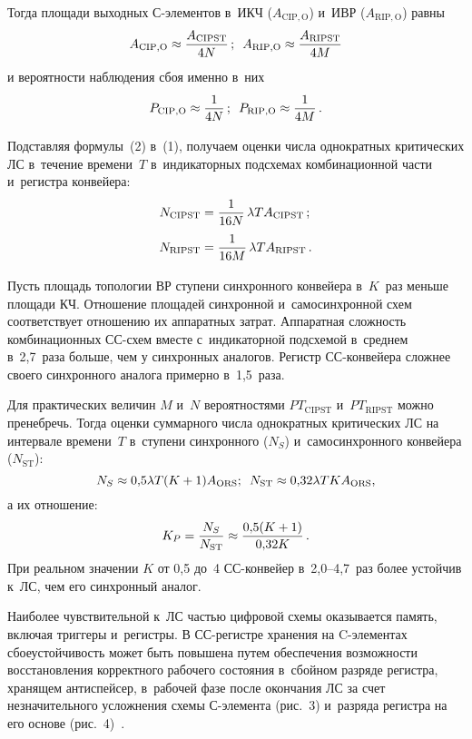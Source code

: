 \begin{multicols}{2}
  Тогда площади выходных С-эле\-мен\-тов в~ИКЧ ($A_{\mathrm{CIP,O}}$) и~ИВР 
($A_{\mathrm{RIP,O}}$) равны 
  $$
  A_{\mathrm{CIP,O}}\approx \displaystyle\frac{\displaystyle A_{\mathrm{CIPST}}\mathstrut}{\displaystyle 4N\mathstrut}\,;\enskip
  A_{\mathrm{RIP,O}}\approx \displaystyle\frac{\displaystyle A_{\mathrm{RIPST}}\mathstrut}{\displaystyle 4M\mathstrut}
  $$
и вероятности наблюдения сбоя именно в~них
\begin{equation}
P_{\mathrm{CIP,O}}\approx\displaystyle\frac{\displaystyle 1\mathstrut}{\displaystyle 4N\mathstrut}\,;\enskip P_{\mathrm{RIP,O}}\approx \displaystyle\frac{\displaystyle 1\mathstrut}{\displaystyle 4M\mathstrut}\,.
\label{e2-sok}
\end{equation}
  
  Подставляя формулы~(2) в~(1), получаем оценки  числа однократных 
критических ЛС в~течение времени~$T$ в~индикаторных подсхемах 
комбинационной части и~регистра конвейера:
  \begin{align*}
  N_{\mathrm{CIPST}} &=\displaystyle\frac{\displaystyle 1\mathstrut}{\displaystyle 16N\mathstrut}\,\lambda TA_{\mathrm{CIPST}}\,;\\
  N_{\mathrm{RIPST}}&= \displaystyle\frac{\displaystyle 1\mathstrut}{\displaystyle 16M\mathstrut}\,\lambda T A_{\mathrm{RIPST}}\,.
  \end{align*}
  
  Пусть площадь топологии ВР ступени синхронного конвейера в~$K$~раз 
меньше площади КЧ. Отношение площадей синхронной и~самосинхронной схем 
соответствует отношению их аппаратных затрат. Аппаратная сложность 
комбинационных СС-схем вместе с~индикаторной подсхемой в~среднем 
в~2,7~раза больше, чем у синхронных аналогов. Регистр СС-кон\-вей\-ера 
сложнее своего синхронного аналога примерно в~1,5~раза.
  
  Для практических величин $M$ и~$N$ вероятностями $PT_{\mathrm{CIPST}}$ 
и~$PT_{\mathrm{RIPST}}$ можно пренебречь. Тогда оценки суммарного  числа 
однократных критических ЛС на интервале времени~$T$ в~ступени 
синхронного ($N_S$) и~самосинхронного кон\-вей\-ера ($N_{\mathrm{ST}}$):
  $$
N_S\approx 0{,}5\lambda T (K + 1)A_{\mathrm{ORS}};\enskip
N_{\mathrm{ST}}\approx0{,}32\lambda TK A_{\mathrm{ORS}},
$$
а их отношение:
$$
K_P= \displaystyle\frac{\displaystyle N_S\mathstrut}{\displaystyle N_{\mathrm{ST}}\mathstrut} \approx \displaystyle\frac{\displaystyle 0{,}5(K+1)\mathstrut}{\displaystyle 0{,}32 K\mathstrut}\,.
$$
При реальном значении $K$ от 0,5 до~4 СС-кон\-вей\-ер в~2,0--4,7~раз более 
устойчив к~ЛС, чем его синхронный аналог.
  
  Наиболее чувствительной к~ЛС частью цифровой схемы оказывается память, 
включая триггеры и~регистры. В СС-ре\-гист\-ре хранения на  
C-эле\-мен\-тах~\cite{6-sok} сбоеустойчивость может быть повышена путем 
обеспечения возможности восстановления корректного рабочего состояния 
в~сбойном разряде регистра, хранящем антиспейсер, в~рабочей фазе после 
окончания ЛС за счет незначительного усложнения схемы С-эле\-мен\-та 
(рис.~3) и~разряда регистра на его основе (рис.~4)~\cite{5-sok}. 


\end{multicols}

